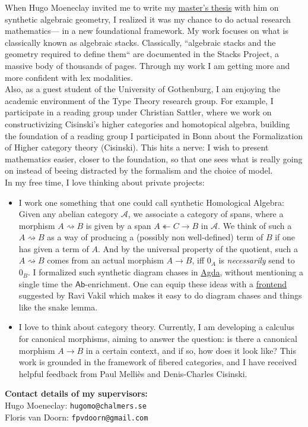 \documentclass[12pt,headings=small,paper=A4,DIV=calc]{article}
\begin{document}
When Hugo Moeneclay invited me to write my \href{https://github.com/timlichtnau/MasterThesis/blob/Main}{master's thesis} with him on synthetic algebraic geometry, I realized it was my chance to do actual research mathematics--- in a new foundational framework. My work focuses on what is classically known as algebraic stacks. Classically, ``algebraic stacks and the geometry required to define them`` are documented in the Stacks Project, a massive body of thousands of pages. Through my work I am getting more and more confident with lex modalities. \\
Also, as a guest student of the University of Gothenburg, I am enjoying the academic environment of the Type Theory research group. For example, I participate in a reading group under Christian Sattler, where we work on constructivizing Cisinski's higher categories and homotopical algebra, building the foundation of a reading group I participated in Bonn about the Formalization of Higher category theory (Cisinski). This hits a nerve: I wish to present mathematics easier, closer to the foundation, so that one sees what is really going on instead of beeing distracted by the formalism and the choice of model. \\

In my free time, I love thinking about private projects: 
\begin{itemize}
	\item I work one something that one could call synthetic Homological Algebra: Given any abelian category $\mathcal{A}$, we associate a category of spans, where a morphism $A \rightsquigarrow B$ is given by a span $A \twoheadleftarrow C \to B$ in $\mathcal{A}$. We think of such a $A \rightsquigarrow B$ as a way of producing a (possibly non well-defined) term of $B$ if one has given a term of $A$. And by the universal property of the quotient, such a $A \rightsquigarrow B$ comes from an actual morphism $A \to B$, iff $0_A$ is \emph{necessarily} send to $0_B$. I formalized such synthetic diagram chases in \href{https://github.com/timlichtnau/CarpetsOnAgda/blob/master/}{Agda}, without mentioning a single time the $\mathsf{Ab}$-enrichment. One can equip these ideas with a \href{https://www.3blue1brown.com/content/blog/exact-sequence-picturebook/PuzzlingThroughExactSequences.pdf}{frontend} suggested by Ravi Vakil which makes it easy to do diagram chases and things like the snake lemma. 
	\item  I love to think about category theory. Currently, I am developing a calculus for canonical morphisms, aiming to answer the question: is there a canonical morphism $A \to B$ in a certain context, and if so, how does it look like? This work is grounded in the framework of fibered categories, and I have received helpful feedback from Paul Melliès and Denis-Charles Cisinski. \\
\end{itemize}

\textbf{Contact details of my supervisors:} \\
Hugo Moeneclay: \texttt{hugomo@chalmers.se} \\
Floris van Doorn: \texttt{fpvdoorn@gmail.com}
\end{document}
